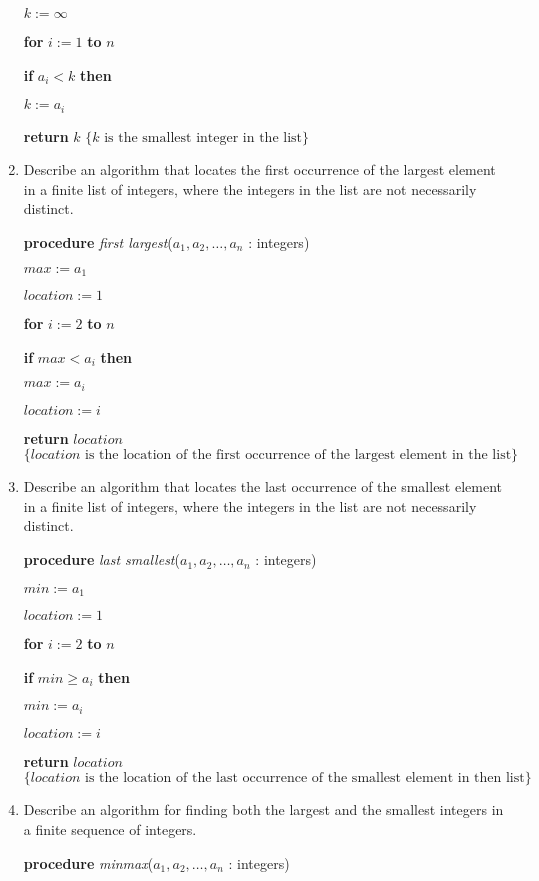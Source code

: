 \documentclass[11pt]{article}
\begin{document}
\begin{enumerate}[label=\textbf{\arabic*.}]
	$k := \infty$
	
	\textbf{for} $i := 1$ \textbf{to} $n$
	
	\qquad \textbf{if} $a_i < k$ \textbf{then}
	
	\qquad\qquad $k := a_i$
	
	\textbf{return} $k$ $\{ k \text{ is the smallest integer in the list} \}$
	
	\item Describe an algorithm that locates the first occurrence of the largest element in a finite list of integers, where the integers in the list are not necessarily distinct.
	
	\textbf{procedure} \emph{first largest}($a_1, a_2, \ldots, a_n$ : integers)
	
	$max := a_1$
	
	$location := 1$
	
	\textbf{for} $i := 2$ \textbf{to} $n$
	
	\qquad \textbf{if} $max < a_i$ \textbf{then}
	
	\qquad\qquad $max := a_i$
	
	\qquad\qquad $location := i$
	
	\textbf{return} $location$ $\{ location \text{ is the location of the first occurrence of the largest element in the list} \}$
	
	\item Describe an algorithm that locates the last occurrence of the smallest element in a finite list of integers, where the integers in the list are not necessarily distinct.
	
	\textbf{procedure} \emph{last smallest}($a_1, a_2, \ldots, a_n$ : integers)
	
	$min := a_1$
	
	$location := 1$
	
	\textbf{for} $i := 2$ \textbf{to} $n$
	
	\qquad \textbf{if} $min \geq a_i$ \textbf{then}
	
	\qquad\qquad $min := a_i$
	
	\qquad\qquad $location := i$
	
	\textbf{return} $location$ $\{ location \text{ is the location of the last occurrence of the smallest element in then list} \}$
	
	\item Describe an algorithm for finding both the largest and the smallest integers in a finite sequence of integers.
	
	\textbf{procedure} \emph{minmax}($a_1, a_2, \ldots, a_n$ : integers)
	

\end{enumerate}
\end{document}
